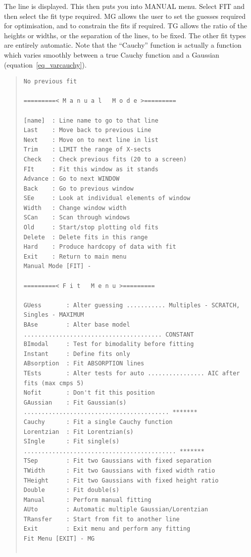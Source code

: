 The line is displayed.  This then puts you into MANUAL menu. Select FIT
and then select the fit type required.  MG allows the user to set the
guesses required for optimisation, and to constrain the fits if
required. TG allows the ratio of the heights or widths, or the
separation of the lines, to be fixed. The other fit types are entirely
automatic. Note that the ``Cauchy'' function is actually a function
which varies smoothly between a true Cauchy function and a Gaussian
(equation~\ref{eq_varcauchy}).

\begin{quote}\begin{small}\begin{verbatim}
No previous fit
 
=========< M a n u a l   M o d e >=========
 
[name]  : Line name to go to that line
Last    : Move back to previous Line
Next    : Move on to next line in list
Trim    : LIMIT the range of X-sects
Check   : Check previous fits (20 to a screen)
FIt     : Fit this window as it stands
Advance : Go to next WINDOW
Back    : Go to previous window
SEe     : Look at individual elements of window
Width   : Change window width
SCan    : Scan through windows
Old     : Start/stop plotting old fits
Delete  : Delete fits in this range
Hard    : Produce hardcopy of data with fit
Exit    : Return to main menu
Manual Mode [FIT] -
 
=========< F i t   M e n u >=========
 
GUess       : Alter guessing ........... Multiples - SCRATCH, Singles - MAXIMUM
BAse        : Alter base model ....................................... CONSTANT
BImodal     : Test for bimodality before fitting
Instant     : Define fits only
ABsorption  : Fit ABSORPTION lines
TEsts       : Alter tests for auto ................ AIC after fits (max cmps 5)
Nofit       : Don't fit this position
GAussian    : Fit Gaussian(s) ......................................... *******
Cauchy      : Fit a single Cauchy function
Lorentzian  : Fit Lorentzian(s)
SIngle      : Fit single(s) ........................................... *******
TSep        : Fit two Gaussians with fixed separation
TWidth      : Fit two Gaussians with fixed width ratio
THeight     : Fit two Gaussians with fixed height ratio
Double      : Fit double(s)
Manual      : Perform manual fitting
AUto        : Automatic multiple Gaussian/Lorentzian
TRansfer    : Start from fit to another line
Exit        : Exit menu and perform any fitting
Fit Menu [EXIT] - MG
 

\end{verbatim}
\end{small}
\end{quote}
